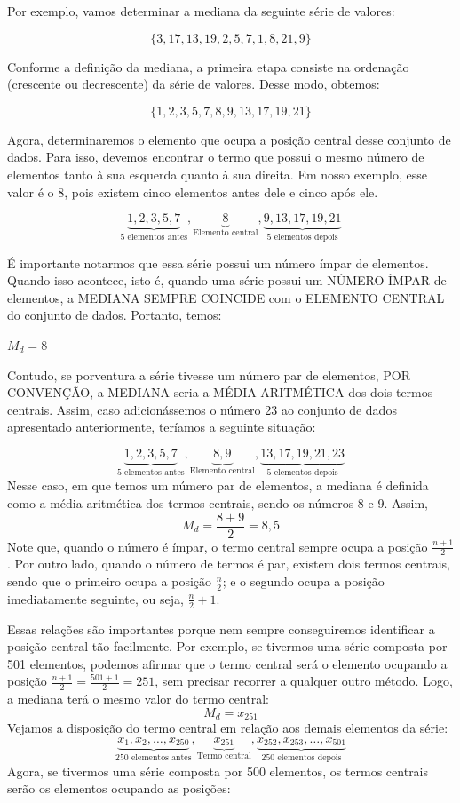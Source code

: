 Por exemplo, vamos determinar a mediana da seguinte série de valores:

\[
    \{3, 17, 13, 19, 2, 5, 7, 1, 8, 21, 9\}
\]

Conforme a definição da mediana, a primeira etapa consiste na ordenação (crescente ou decrescente) da série de valores. Desse modo, obtemos:

\[
    \{1, 2, 3, 5, 7, 8, 9, 13, 17, 19, 21\}
\]

Agora, determinaremos o elemento que ocupa a posição central desse conjunto de dados. Para isso, devemos encontrar o termo que possui o mesmo número de elementos tanto à sua esquerda quanto à sua direita. Em nosso exemplo, esse valor é o 8, pois existem cinco elementos antes dele e cinco após ele.

\[
    \underbrace{1, 2, 3, 5, 7}_{\text{5 elementos antes}}, \underbrace{8}_{\text{Elemento central}}, \underbrace{9, 13, 17, 19, 21}_{\text{5 elementos depois}}
\]

É importante notarmos que essa série possui um número ímpar de elementos. Quando isso acontece, isto é, quando uma série possui um NÚMERO ÍMPAR de elementos, a MEDIANA SEMPRE COINCIDE com o ELEMENTO CENTRAL do conjunto de dados. Portanto, temos:

\begin{center}
    \(M_d=8\)
\end{center}
Contudo, se porventura a série tivesse um número par de elementos, POR CONVENÇÃO, a MEDIANA seria a MÉDIA ARITMÉTICA dos dois termos centrais. Assim, caso adicionássemos o número 23 ao conjunto de dados apresentado anteriormente, teríamos a seguinte situação:

\[
    \underbrace{1, 2, 3, 5, 7}_{\text{5 elementos antes}}, \underbrace{8, 9}_{\text{Elemento central}}, \underbrace{ 13, 17, 19, 21, 23}_{\text{5 elementos depois}}
\]
Nesse caso, em que temos um número par de elementos, a mediana é definida como a média aritmética dos termos centrais, sendo os números 8 e 9. Assim,
\[
    M_d=\frac{8+9}{2}=8,5
\]
Note que, quando o número é ímpar, o termo central sempre ocupa a posição \(\frac{n+1}{2}\). Por outro lado, quando o número de termos é par, existem dois termos centrais, sendo que o primeiro ocupa a posição \(\frac{n}{2}\); e o
segundo ocupa a posição imediatamente seguinte, ou seja, \(\frac{n}{2}+1\).

Essas relações são importantes porque nem sempre conseguiremos identificar a posição central tão facilmente. Por exemplo, se tivermos uma série composta por 501 elementos, podemos afirmar que o termo central será o elemento ocupando a posição \(\frac{n+1}{2}=\frac{501+1}{2}=251\), sem precisar recorrer a qualquer outro
método. Logo, a mediana terá o mesmo valor do termo central:
\[
    M_d=x_{251}
\]
Vejamos a disposição do termo central em relação aos demais elementos da série:
\[
    \underbrace{x_1, x_2, \dots, x_{250}}_{\text{250 elementos antes}}, \underbrace{x_{251}}_{\text{Termo central}}, \underbrace{ x_{252}, x_{253}, \dots, x_{501}}_{\text{250 elementos depois}}
\]
Agora, se tivermos uma série composta por 500 elementos, os termos centrais serão os elementos ocupando as posições:

